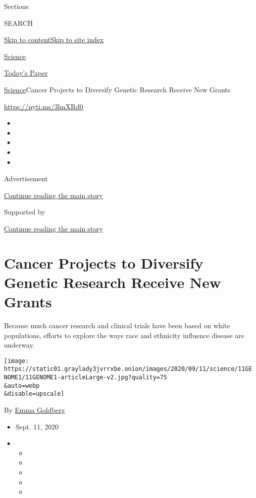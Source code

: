 Sections

SEARCH

\protect\hyperlink{site-content}{Skip to
content}\protect\hyperlink{site-index}{Skip to site index}

\href{https://www.nytimes3xbfgragh.onion/section/science}{Science}

\href{https://myaccount.nytimes3xbfgragh.onion/auth/login?response_type=cookie\&client_id=vi}{}

\href{https://www.nytimes3xbfgragh.onion/section/todayspaper}{Today's
Paper}

\href{/section/science}{Science}\textbar{}Cancer Projects to Diversify
Genetic Research Receive New Grants

\url{https://nyti.ms/3hnXRd0}

\begin{itemize}
\item
\item
\item
\item
\item
\end{itemize}

Advertisement

\protect\hyperlink{after-top}{Continue reading the main story}

Supported by

\protect\hyperlink{after-sponsor}{Continue reading the main story}

\hypertarget{cancer-projects-to-diversify-genetic-research-receive-new-grants}{%
\section{Cancer Projects to Diversify Genetic Research Receive New
Grants}\label{cancer-projects-to-diversify-genetic-research-receive-new-grants}}

Because much cancer research and clinical trials have been based on
white populations, efforts to explore the ways race and ethnicity
influence disease are underway.

\texttt{[image: https://static01.graylady3jvrrxbe.onion/images/2020/09/11/science/11GENOME1/11GENOME1-articleLarge-v2.jpg?quality=75\\\&auto=webp\\\&disable=upscale]}

By \href{https://www.nytimes3xbfgragh.onion/by/emma-goldberg}{Emma
Goldberg}

\begin{itemize}
\item
  Sept. 11, 2020
\item
  \begin{itemize}
  \item
  \item
  \item
  \item
  \item
  \end{itemize}
\end{itemize}

